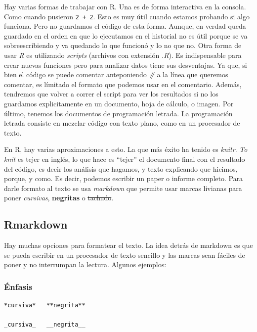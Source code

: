 \documentclass[]{book}
\theoremstyle{definition}
\theoremstyle{definition}
\theoremstyle{definition}
\theoremstyle{remark}
\begin{document}
Hay varias formas de trabajar con R. Una es de forma interactiva en la
consola. Como cuando pusieron \texttt{2\ +\ 2}. Esto es muy útil cuando
estamos probando si algo funciona. Pero no guardamos el código de esta
forma. Aunque, en verdad queda guardado en el orden en que lo ejecutamos
en el historial no es útil porque se va sobreescribiendo y va quedando
lo que funcionó y lo no que no. Otra forma de usar \emph{R} es
utilizando \emph{scripts} (archivos con extensión \emph{.R}). Es
indispensable para crear nuevas funciones pero para analizar datos tiene
sus desventajas. Ya que, si bien el código se puede comentar
anteponiendo \emph{\#} a la línea que queremos comentar, es límitado el
formato que podemos usar en el comentario. Además, tendremos que volver
a correr el script para ver los resultados si no los guardamos
explicitamente en un documento, hoja de cálculo, o imagen. Por último,
tenemos los documentos de programación letrada. La programación letrada
consiste en mezclar código con texto plano, como en un procesador de
texto.

En R, hay varias aproximaciones a esto. La que más éxito ha tenido es
\emph{knitr}. \emph{To knit} es tejer en inglés, lo que hace es
``tejer'' el documento final con el resultado del código, es decir los
análisis que hagamos, y texto explicando que hicimos, porque, y como. Es
decir, podemos escribir un paper o informe completo. Para darle formato
al texto se usa \emph{markdown} que permite usar marcas livianas para
poner \emph{cursivas}, \textbf{negritas} o \sout{tachado}.

\hypertarget{rmarkdown}{%
\subsection{Rmarkdown}\label{rmarkdown}}

Hay muchas opciones para formatear el texto. La idea detrás de markdown
es que se pueda escribir en un procesador de texto sencillo y las marcas
sean fáciles de poner y no interrumpan la lectura. Algunos ejemplos:

\hypertarget{enfasis}{%
\subsubsection{Énfasis}\label{enfasis}}

\begin{verbatim}
*cursiva*   **negrita**

_cursiva_   __negrita__
\end{verbatim}
\end{document}
